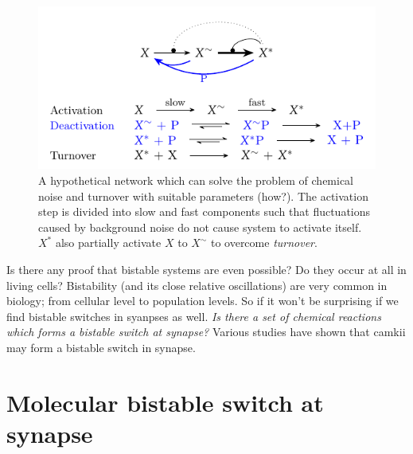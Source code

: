 \documentclass[]{resonance}
\begin{document}
\begin{figure}[t!]
\centering
\includegraphics[width=\linewidth]{./fig_model_b.pdf}
\caption{A hypothetical network which can solve the problem of chemical noise and
    turnover with suitable parameters (how?). The activation step is divided into slow and fast
    components such that fluctuations caused by background noise do not cause system to 
    activate itself. $X^*$ also partially activate $X$ to $X^\sim$ to overcome \textit{turnover}. 
}\label{fig:model_bistable}
\end{figure}

Is there any  proof that bistable systems are even possible? Do they occur at
all in living cells?  Bistability (and its close relative oscillations) are very
common in biology; from cellular level to population levels. So if it won't be
surprising if we find bistable switches in syanpses as well.  \emph{Is there a set
of chemical reactions which forms a bistable switch at synapse?} Various studies
have shown that \gls{camkii} may form a bistable switch in synapse.

\section{Molecular bistable switch at synapse}\label{sec:molecular_switch}

\end{document}
